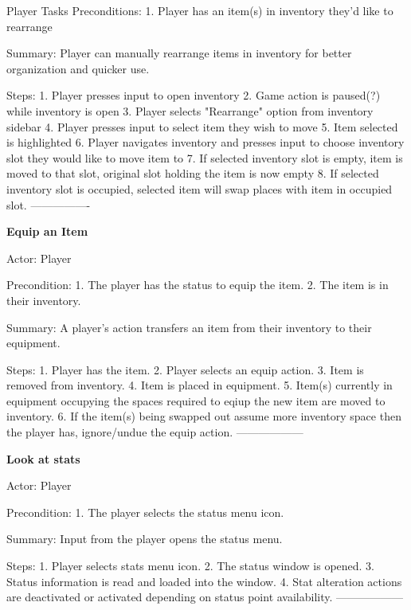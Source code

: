 \documentclass[12pt]{report}
\begin{document}
\begin {section}{Player Tasks}
Preconditions:
1. Player has an item(s) in inventory they'd like to rearrange

Summary: Player can manually rearrange items in inventory for better organization and quicker use.

Steps:
1. Player presses input to open inventory
2. Game action is paused(?) while inventory is open
3. Player selects "Rearrange" option from inventory sidebar
4. Player presses input to select item they wish to move
5. Item selected is highlighted
6. Player navigates inventory and presses input to choose inventory slot they would like to move item to
7. If selected inventory slot is empty, item is moved to that slot, original slot holding the item is now empty
8. If selected inventory slot is occupied, selected item will swap places with item in occupied slot. 
----------------

\textbf{Equip an Item} %

Actor: Player

Precondition: 
1. The player has the status to equip the item. 
2. The item is in their inventory.

Summary: A player's action transfers an item from their inventory to their equipment.

Steps:
1. Player has the item.
2. Player selects an equip action.
3. Item is removed from inventory.
4. Item is placed in equipment.
5. Item(s) currently in equipment occupying the spaces required to eqiup the new item are moved to inventory.
6. If the item(s) being swapped out assume more inventory space then the player has, ignore/undue the equip action.
------------------

\textbf{Look at stats} %

Actor: Player

Precondition:
1. The player selects the status menu icon.

Summary: Input from the player opens the status menu.

Steps:
1. Player selects stats menu icon.
2. The status window is opened.
3. Status information is read and loaded into the window.
4. Stat alteration actions are deactivated or activated depending on status point availability.
------------------

\end{section}
\end{document}
